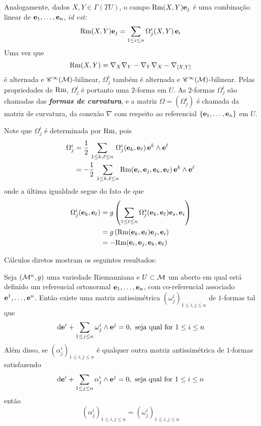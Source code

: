 Analogamente, dados $X, Y \in \Gamma(T U)$, o campo $\mathrm{Rm}(X, Y)\mathbf{e}_j$ é uma combinação linear de $\mathbf{e}_1, \ldots, \mathbf{e}_n$, \emph{id est:}
\[
\mathrm{Rm}(X, Y) \mathbf{e}_j = \sum_{1 \leq i \leq n} \Omega^{i}_j(X, Y) \, \mathbf{e}_i
\]
Uma vez que
\[
\mathrm{Rm}(X, Y) = \nabla_X \nabla_Y - \nabla_Y \nabla_X - \nabla_{[X, Y]}
\]
é alternada e $\mathscr{C}^{\infty}(\mathcal{M})$-bilinear, $\Omega^{i}_j$ também é alternada e $\mathscr{C}^{\infty}(\mathcal{M})$-bilinear. Pelas propriedades de $\mathrm{Rm}$, $\Omega^{i}_j$ é portanto uma $2$-forma em $U$. As $2$-formas $\Omega^{i}_j$ são chamadas das \textbf{\textit{formas de curvatura}}, e a matriz $\Omega = (\Omega^{i}_j)$ é chamada da matriz de curvatura, da conexão $\nabla$ com respeito ao referencial $\{\mathbf{e}_1, \ldots, \mathbf{e}_n \}$ em $U$. 
\begin{oobs}
Note que $\Omega^{i}_j$ é determinada por $\mathrm{Rm}$, pois
\[ \begin{aligned}
\Omega^{i}_j &= \frac{1}{2} \, \sum_{1 \leq k, \ell \leq n}  \, \Omega^i_j(\mathbf{e}_k, \mathbf{e}_{\ell}) \, \mathbf{e}^k \wedge \mathbf{e}^{\ell} \\
&= -\frac{1}{2} \,  \sum_{1 \leq k, \ell \leq n} \mathrm{Rm}(\mathbf{e}_i, \mathbf{e}_j, \mathbf{e}_k, \mathbf{e}_{\ell})  \, \mathbf{e}^k \wedge \mathbf{e}^{\ell}
\end{aligned}
\]
onde a última igualdade segue do fato de que 
\[
\begin{aligned}
\Omega^i_j(\mathbf{e}_k, \mathbf{e}_{\ell}) &= g\left( \sum_{1 \leq t \leq n} \Omega^{s}_j(\mathbf{e}_k, \mathbf{e}_{\ell}) \mathbf{e}_s, \mathbf{e}_i \right) \\
&= g\left( \mathrm{Rm}(\mathbf{e}_k, \mathbf{e}_{\ell}) \mathbf{e}_j, \mathbf{e}_i \right) \\
&= - \mathrm{Rm}(\mathbf{e}_i, \mathbf{e}_j, \mathbf{e}_k, \mathbf{e}_{\ell})
\end{aligned}
\]
\end{oobs}
Cálculos diretos mostram os seguintes resultados:
\begin{teorema}\label{PrimeiraUnicaCartan}
Seja $(\mathcal{M}^n, g)$ uma variedade Riemanniana e $U \subset \mathcal{M}$ um aberto em qual está definido um referencial ortonormal $\mathbf{e}_1, \ldots, \mathbf{e}_n$, com co-referencial associado $\mathbf{e}^1, \ldots, \mathbf{e}^n$. Então existe uma matriz antissimétrica $\left(\omega^{i}_j \right)_{1 \leq i, j \leq n}$ de $1$-formas tal que
\[
\mathrm{d} \mathbf{e}^i + \sum_{1 \leq j \leq n} \omega^{i}_j \wedge \mathbf{e}^j = 0, \text{ seja qual for } 1 \leq i \leq n
\]
Além disso, se $\left(\alpha^{i}_j \right)_{1 \leq i, j \leq n}$ é qualquer outra matriz antissimétrica de $1$-formas satisfazendo
\begin{equation}
\mathrm{d} \mathbf{e}^i + \sum_{1 \leq j \leq n} \alpha^{i}_j \wedge \mathbf{e}^j = 0, \text{ seja qual for } 1 \leq i \leq n
\end{equation} então \[ \left(\alpha^{i}_j \right)_{1 \leq i, j \leq n} = \left(\omega^{i}_j \right)_{1 \leq i, j \leq n} \]
\end{teorema}
